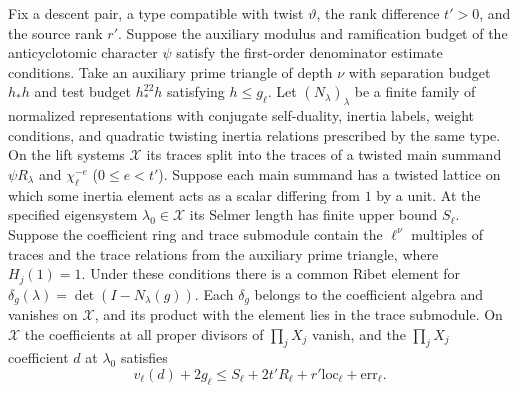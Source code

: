 \begin{lemma}
\label{lem:c-ribet-columns}
\emitthmsource
Fix a descent pair, a type compatible with twist $\vartheta$, the rank difference $t'>0$, and the source rank $r'$.
Suppose the auxiliary modulus and ramification budget of the anticyclotomic character $\psi$ satisfy the first-order denominator estimate conditions.
Take an auxiliary prime triangle of depth $\nu$ with separation budget $h_* h$ and test budget $h_*^{22}h$ satisfying $h\le g_\ell$.
Let $(N_\lambda)_\lambda$ be a finite family of normalized representations with conjugate self-duality, inertia labels, weight conditions, and quadratic twisting inertia relations prescribed by the same type. On the lift systems $\mathcal X$ its traces split into the traces of a twisted main summand $\psi R_\lambda$ and $\chi_\ell^{-e}$ ($0\le e<t'$).
Suppose each main summand has a twisted lattice on which some inertia element acts as a scalar differing from $1$ by a unit. At the specified eigensystem $\lambda_0\in\mathcal X$ its Selmer length has finite upper bound $S_\ell$.
Suppose the coefficient ring and trace submodule contain the $\ell^\nu$ multiples of traces and the trace relations from the auxiliary prime triangle, where $H_j(1)=1$.
Under these conditions there is a common Ribet element for $\delta_g(\lambda)=\det(I-N_\lambda(g))$. Each $\delta_g$ belongs to the coefficient algebra and vanishes on $\mathcal X$, and its product with the element lies in the trace submodule. On $\mathcal X$ the coefficients at all proper divisors of $\prod_j X_j$ vanish, and the $\prod_j X_j$ coefficient $d$ at $\lambda_0$ satisfies
\[
 v_\ell(d)+2g_\ell\le
 S_\ell+2t'R_\ell+r'\mathrm{loc}_\ell+\mathrm{err}_\ell .
\]
\end{lemma}
